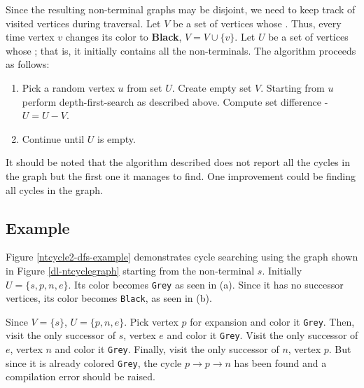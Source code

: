 Since the resulting non-terminal graphs may be disjoint, we need to keep track of visited vertices during traversal. Let $V$ be a set of vertices whose . Thus, every time vertex $v$ changes its color to \textbf{Black}, $V = V \cup \{v\} $. Let $U$ be a set of vertices whose ; that is, it initially contains all the non-terminals. The algorithm proceeds as follows:

\begin{enumerate}
\item
Pick a random vertex $u$ from set $U$. Create empty set $V$. Starting from $u$ perform depth-first-search as described above. Compute set difference - $U = U-V$.
\item
Continue until $U$ is empty.
\end{enumerate}

It should be noted that the algorithm described does not report all the cycles in the graph but the first one it manages to find. One improvement could be finding all cycles in the graph.

\subsection{Example}

Figure \ref{ntcycle2-dfs-example} demonstrates cycle searching using the graph shown in Figure \ref{dl-ntcyclegraph} starting from the non-terminal $s$. Initially $U=\{s,p,n,e\}$. Its color becomes \texttt{Grey} as seen in (a). Since it has no successor vertices, its color becomes \texttt{Black}, as seen in (b). 

Since $V = \{ s \}$, $U=\{p,n,e\}$. Pick vertex $p$ for expansion and color it \texttt{Grey}. Then, visit the only successor of $s$, vertex $e$ and color it \texttt{Grey}. Visit the only successor of $e$, vertex $n$ and color it \texttt{Grey}. Finally, visit the only successor of $n$, vertex $p$. But since it is already colored \texttt{Grey}, the cycle  $p \rightarrow p \rightarrow n$ has been found and a compilation error should be raised.

